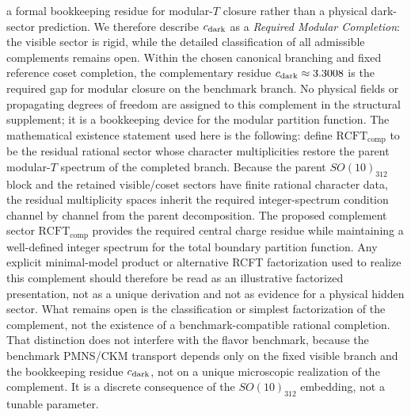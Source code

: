 \documentclass[11pt]{article}
\begin{document}
a formal bookkeeping residue for modular-$T$ closure rather than a physical dark-sector prediction. We therefore describe $c_{\rm dark}$ as a \emph{Required Modular Completion}: the visible sector is rigid, while the detailed classification of all admissible complements remains open. Within the chosen canonical branching and fixed reference coset completion, the complementary residue $c_{\rm dark}\approx 3.3008$ is the required gap for modular closure on the benchmark branch. No physical fields or propagating degrees of freedom are assigned to this complement in the structural supplement; it is a bookkeeping device for the modular partition function. The mathematical existence statement used here is the following: define $\mathrm{RCFT}_{\mathrm{comp}}$ to be the residual rational sector whose character multiplicities restore the parent modular-$T$ spectrum of the completed branch. Because the parent $SO(10)_{312}$ block and the retained visible/coset sectors have finite rational character data, the residual multiplicity spaces inherit the required integer-spectrum condition channel by channel from the parent decomposition. The proposed complement sector $\mathrm{RCFT}_{\mathrm{comp}}$ provides the required central charge residue while maintaining a well-defined integer spectrum for the total boundary partition function. Any explicit minimal-model product or alternative RCFT factorization used to realize this complement should therefore be read as an illustrative factorized presentation, not as a unique derivation and not as evidence for a physical hidden sector. What remains open is the classification or simplest factorization of the complement, not the existence of a benchmark-compatible rational completion. That distinction does not interfere with the flavor benchmark, because the benchmark PMNS/CKM transport depends only on the fixed visible branch and the bookkeeping residue $c_{\rm dark}$, not on a unique microscopic realization of the complement. It is a discrete consequence of the $SO(10)_{312}$ embedding, not a tunable parameter.
\end{document}
